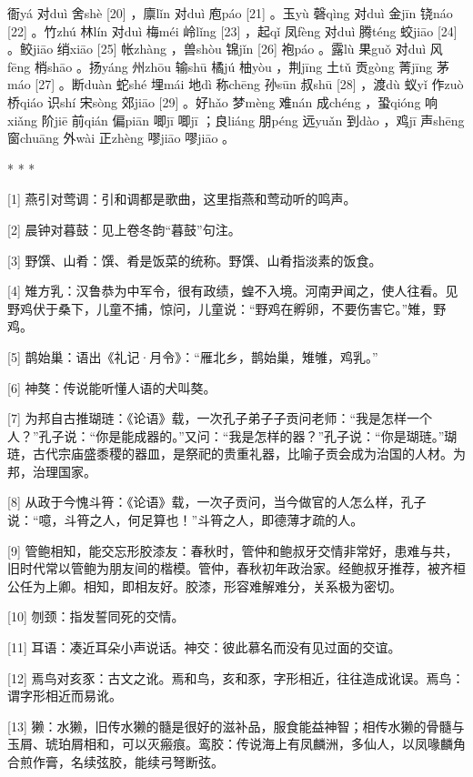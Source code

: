 \documentclass[12pt,UTF8]{ctexbook}
\begin{document}
衙yá 对duì 舍shè [20] ，廪lǐn 对duì 庖páo [21] 。玉yù 磬qìng 对duì 金jīn 铙náo [22] 。竹zhú 林lín 对duì 梅méi 岭lǐng [23] ，起qǐ 凤fèng 对duì 腾téng 蛟jiāo [24] 。鲛jiāo 绡xiāo [25] 帐zhàng ，兽shòu 锦jǐn [26] 袍páo 。露lù 果guǒ 对duì 风fēng 梢shāo 。扬yáng 州zhōu 输shū 橘jú 柚yòu ，荆jīng 土tǔ 贡gòng 菁jīng 茅máo [27] 。断duàn 蛇shé 埋mái 地dì 称chēng 孙sūn 叔shū [28] ，渡dù 蚁yǐ 作zuò 桥qiáo 识shí 宋sòng 郊jiāo [29] 。好hǎo 梦mèng 难nán 成chéng ，蛩qióng 响xiǎng 阶jiē 前qián 偏piān 唧jī 唧jī ；良liáng 朋péng 远yuǎn 到dào ，鸡jī 声shēng 窗chuāng 外wài 正zhèng 嘐jiāo 嘐jiāo 。



* * *



[1] 燕引对莺调：引和调都是歌曲，这里指燕和莺动听的鸣声。

[2] 晨钟对暮鼓：见上卷冬韵“暮鼓”句注。

[3] 野馔、山肴：馔、肴是饭菜的统称。野馔、山肴指淡素的饭食。

[4] 雉方乳：汉鲁恭为中军令，很有政绩，蝗不入境。河南尹闻之，使人往看。见野鸡伏于桑下，儿童不捕，惊问，儿童说：“野鸡在孵卵，不要伤害它。”雉，野鸡。

[5] 鹊始巢：语出《礼记·月令》：“雁北乡，鹊始巢，雉雊，鸡乳。”

[6] 神獒：传说能听懂人语的犬叫獒。

[7] 为邦自古推瑚琏：《论语》载，一次孔子弟子子贡问老师：“我是怎样一个人？”孔子说：“你是能成器的。”又问：“我是怎样的器？”孔子说：“你是瑚琏。”瑚琏，古代宗庙盛黍稷的器皿，是祭祀的贵重礼器，比喻子贡会成为治国的人材。为邦，治理国家。

[8] 从政于今愧斗筲：《论语》载，一次子贡问，当今做官的人怎么样，孔子说：“噫，斗筲之人，何足算也！”斗筲之人，即德薄才疏的人。

[9] 管鲍相知，能交忘形胶漆友：春秋时，管仲和鲍叔牙交情非常好，患难与共，旧时代常以管鲍为朋友间的楷模。管仲，春秋初年政治家。经鲍叔牙推荐，被齐桓公任为上卿。相知，即相友好。胶漆，形容难解难分，关系极为密切。

[10] 刎颈：指发誓同死的交情。

[11] 耳语：凑近耳朵小声说话。神交：彼此慕名而没有见过面的交谊。

[12] 焉鸟对亥豕：古文之讹。焉和鸟，亥和豕，字形相近，往往造成讹误。焉鸟：谓字形相近而易讹。

[13] 獭：水獭，旧传水獭的髓是很好的滋补品，服食能益神智；相传水獭的骨髓与玉屑、琥珀屑相和，可以灭瘢痕。鸾胶：传说海上有凤麟洲，多仙人，以凤喙麟角合煎作膏，名续弦胶，能续弓弩断弦。
\end{document}
